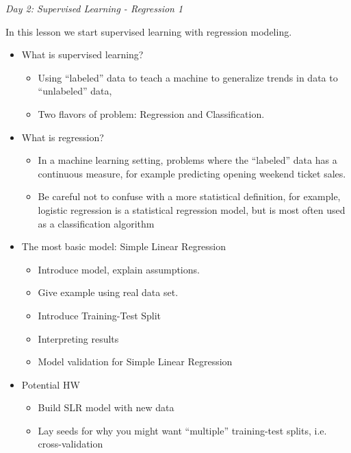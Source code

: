 \documentclass[12pt]{article}
\begin{document}
	
	
	
	
	
	\vspace{2mm}
	\noindent
	\textit{\large{Day 2: Supervised Learning - Regression 1}}
	
	\noindent
	In this lesson we start supervised learning with regression modeling.
	
	\begin{itemize}
		\item What is supervised learning?
			\begin{itemize}
				\item Using ``labeled'' data to teach a machine to generalize trends in data to ``unlabeled'' data,
				\item Two flavors of problem: Regression and Classification.
			\end{itemize}
		\item What is regression?
			\begin{itemize}
				\item In a machine learning setting, problems where the ``labeled'' data has a continuous measure, for example predicting opening weekend ticket sales.
				\item Be careful not to confuse with a more statistical definition, for example, logistic regression is a statistical regression model, but is most often used as a classification algorithm
			\end{itemize}
		\item The most basic model: Simple Linear Regression
			\begin{itemize}
				\item Introduce model, explain assumptions.
				\item Give example using real data set.
				\item Introduce Training-Test Split
				\item Interpreting results
				\item Model validation for Simple Linear Regression
			\end{itemize}
		\item Potential HW
			\begin{itemize}
				\item Build SLR model with new data
				\item Lay seeds for why you might want ``multiple'' training-test splits, i.e. cross-validation
			\end{itemize}
	\end{itemize}
\end{document}
